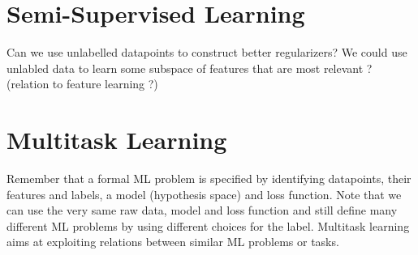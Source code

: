 \documentclass[12pt]{report}
\begin{document}

\section{Semi-Supervised Learning} 
Can we use unlabelled datapoints to construct better regularizers? We could use unlabled data 
to learn some subspace of features that are most relevant ? (relation to feature learning ?)

\section{Multitask Learning} 
Remember that a formal ML problem is specified by identifying 
datapoints, their features and labels, a model (hypothesis space)
and loss function. Note that we can use the very same raw data, model 
and loss function and still define many different ML problems by 
using different choices for the label. Multitask learning aims at 
exploiting relations between similar ML problems or tasks. 
\end{document}
